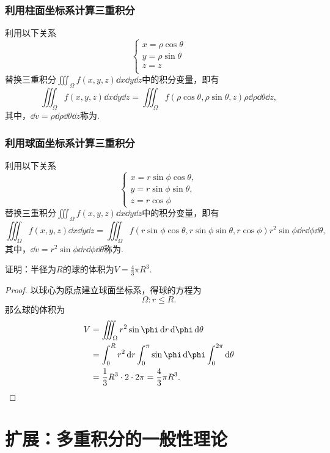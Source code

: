 \subsubsection{利用柱面坐标系计算三重积分}
利用以下关系\[
\left\{ \begin{array}{l}
x = \rho\cos\theta \\
y = \rho\sin\theta \\
z = z \\
\end{array} \right.
\]替换三重积分\(\iiint_{\Omega}{f(x,y,z)\dd{x}\dd{y}\dd{z}}\)中的积分变量，即有\[
\iiint_{\Omega}{f(x,y,z)\dd{x}\dd{y}\dd{z}}
= \iiint_{\Omega}{f(\rho \cos\theta,\rho \sin\theta,z) \rho \dd{\rho} \dd{\theta} \dd{z}},
\]其中，\(\dd{v} = \rho \dd{\rho} \dd{\theta} \dd{z}\)称为.

\subsubsection{利用球面坐标系计算三重积分}
利用以下关系\[
\left\{ \begin{array}{l}
x = r \sin\phi \cos\theta, \\
y = r \sin\phi \sin\theta, \\
z = r \cos\phi
\end{array} \right.
\]替换三重积分\(\iiint_{\Omega}{f(x,y,z)\dd{x}\dd{y}\dd{z}}\)中的积分变量，即有\[
\iiint_{\Omega}{f(x,y,z)\dd{x}\dd{y}\dd{z}}
= \iiint_{\Omega}{f(r \sin\phi \cos\theta,r \sin\phi \sin\theta,r \cos\phi) r^2 \sin\phi \dd{r} \dd{\phi} \dd{\theta}},
\]其中，\(\dd{v} = r^2 \sin\phi \dd{r} \dd{\phi} \dd{\theta}\)称为.

\begin{example}
证明：半径为\(R\)的球的体积为\(V = \frac{4}{3} \pi R^3\).
\begin{proof}
以球心为原点建立球面坐标系，得球的方程为\[
\Omega: r \leq R.
\]那么球的体积为\begin{align*}
V &= \iiint_{\Omega} r^2 \sin\phi \dd{r} \dd{\phi} \dd{\theta} \\
&= \int_0^R r^2 \dd{r} \int_0^{\pi} \sin\phi \dd{\phi} \int_0^{2\pi} \dd{\theta} \\
&= \frac{1}{3} R^3 \cdot 2 \cdot 2\pi
= \frac{4}{3} \pi R^3.
\qedhere
\end{align*}
\end{proof}
\end{example}

\section{扩展：多重积分的一般性理论}
